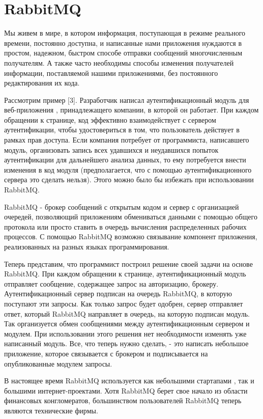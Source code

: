 \chapter{RabbitMQ} %
\label{sec:examples}
Мы живем в мире, в котором информация, поступающая в режиме реального времени, постоянно доступна, и написанные нами приложения нуждаются в простом, надежном, быстром способе отправки сообщений многочисленным получателям. А также часто необходимы способы изменения получателей информации, поставляемой нашими приложениями, без постоянного редактирования их кода.\par
Рассмотрим пример [3]. Разработчик написал аутентификационный модуль для веб-приложения , принадлежащего компании, в которой он работает. При каждом обращении к странице, код эффективно взаимодействует с сервером аутентификации, чтобы удостовериться в том, что пользователь действует в рамках прав доступа. Если компания потребует от программиста, написавшего модуль, организовать запись всех удавшихся и неудавшихся попыток аутентификации для дальнейшего анализа данных, то ему потребуется внести изменения в код модуля (предполагается, что с помощью аутентификационного сервера это сделать нельзя). Этого можно было бы избежать при использовании RabbitMQ.\par 
RabbitMQ - брокер сообщений с открытым кодом и сервер с организацией очередей, позволяющий приложениям обмениваться данными с помощью общего протокола или просто ставить в очередь вычисления распределенных рабочих процессов. С помощью RabbitMQ возможно связывание компонент приложения, реализованных на разных языках программирования.\par 
 Теперь представим, что программист построил решение своей задачи на основе RabbitMQ. При каждом обращении к странице, аутентификационный модуль отправляет сообщение, содержащее запрос на авторизацию, брокеру. Аутентификационный сервер подписан на очередь RabbitMQ, в которую поступают эти запросы. Как только запрос будет одобрен, сервер отправляет ответ, который RabbitMQ направляет в очередь, на которую подписан модуль. Так организуется обмен сообщениями между аутентификационным сервером и модулем. При использовании этого решения нет необходимости изменять уже написанный модуль.  Все, что теперь нужно сделать, - это написать небольшое приложение, которое связывается с брокером и подписывается на опубликованные модулем запросы.\par
В настоящее время RabbitMQ используется как небольшими стартапами , так и большими интернет-проектами. Хотя RabbitMQ берет свое начало из области финансовых конгломератов, большинством пользователей RabbitMQ теперь являются технические фирмы.\par 
